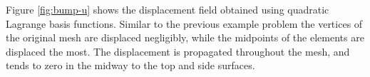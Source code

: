 \documentclass[letter,12pt]{article}
\begin{document}
Figure \ref{fig:bump-u} shows the displacement field obtained using
quadratic Lagrange basis functions. Similar to the previous example
problem the vertices of the original mesh are displaced negligibly,
while the midpoints of the elements are displaced the most. The
displacement is propagated throughout the mesh, and tends to zero in
the midway to the top and side surfaces.

{} 

\end{document}
